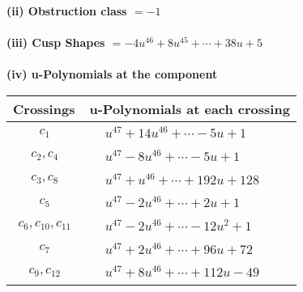 \documentclass[1p]{elsarticle_modified}
\theoremstyle{definition}
\begin{document}
\flushleft \textbf{(ii) Obstruction class $= -1$}\\~\\
\flushleft \textbf{(iii) Cusp Shapes $= -4 u^{46}+8 u^{45}+\cdots+38 u+5$}\\~\\
\newpage\renewcommand{\arraystretch}{1}
\flushleft \textbf{(iv) u-Polynomials at the component}\newline \\
\begin{tabular}{m{50pt}|m{274pt}}
Crossings & \hspace{64pt}u-Polynomials at each crossing \\
\hline $$\begin{aligned}c_{1}\end{aligned}$$&$\begin{aligned}
&u^{47}+14 u^{46}+\cdots-5 u+1
\end{aligned}$\\
\hline $$\begin{aligned}c_{2},c_{4}\end{aligned}$$&$\begin{aligned}
&u^{47}-8 u^{46}+\cdots-5 u+1
\end{aligned}$\\
\hline $$\begin{aligned}c_{3},c_{8}\end{aligned}$$&$\begin{aligned}
&u^{47}+u^{46}+\cdots+192 u+128
\end{aligned}$\\
\hline $$\begin{aligned}c_{5}\end{aligned}$$&$\begin{aligned}
&u^{47}-2 u^{46}+\cdots+2 u+1
\end{aligned}$\\
\hline $$\begin{aligned}c_{6},c_{10},c_{11}\end{aligned}$$&$\begin{aligned}
&u^{47}-2 u^{46}+\cdots-12 u^2+1
\end{aligned}$\\
\hline $$\begin{aligned}c_{7}\end{aligned}$$&$\begin{aligned}
&u^{47}+2 u^{46}+\cdots+96 u+72
\end{aligned}$\\
\hline $$\begin{aligned}c_{9},c_{12}\end{aligned}$$&$\begin{aligned}
&u^{47}+8 u^{46}+\cdots+112 u-49
\end{aligned}$\\
\hline
\end{tabular}\\~\\
\end{document}
